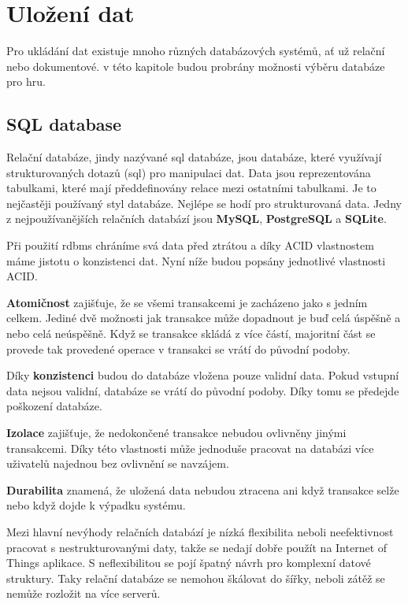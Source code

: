 \section{Uložení dat}\label{sec:data_storage}
Pro ukládání dat existuje mnoho různých databázových systémů, ať už relační nebo dokumentové. v této kapitole budou probrány možnosti výběru databáze pro hru.

\subsection{SQL database}\label{sec:data_storage:relational_db}
Relační databáze, jindy nazývané \gls{sql} databáze, jsou databáze, které využívají strukturovaných dotazů (\gls{sql}) pro manipulaci dat. Data jsou reprezentována tabulkami, které mají předdefinovány relace mezi ostatními tabulkami. Je to nejčastěji používaný styl databáze. Nejlépe se hodí pro strukturovaná data. Jedny z nejpoužívanějších relačních databází jsou \textbf{MySQL}, \textbf{PostgreSQL} a \textbf{SQLite}.\cite{guidetochoosingdatabase}\cite{howtochoosedatabase}

Při použití \gls{rdbms} chráníme svá data před ztrátou a díky ACID vlastnostem máme jistotu o konzistenci dat. Nyní níže budou popsány jednotlivé vlastnosti ACID.\label{sec:data_storage:relational_db:ACID}\cite{acidvsbase}

\textbf{Atomičnost} zajišťuje, že se všemi transakcemi je zacházeno jako s jedním celkem. Jediné dvě možnosti jak transakce může dopadnout je buď celá úspěšně a nebo celá neúspěšně. Když se transakce skládá z více částí, majoritní část se provede tak provedené operace v transakci se vrátí do původní podoby.

Díky \textbf{konzistenci} budou do databáze vložena pouze validní data. Pokud vstupní data nejsou validní, databáze se vrátí do původní podoby. Díky tomu se předejde poškození databáze.

\textbf{Izolace}  zajišťuje, že nedokončené transakce nebudou ovlivněny jinými transakcemi. Díky této vlastnosti může jednoduše pracovat na databázi více uživatelů najednou bez ovlivnění se navzájem.

\textbf{Durabilita} znamená, že uložená data nebudou ztracena ani když transakce selže nebo když dojde k výpadku systému.

Mezi hlavní nevýhody relačních databází je nízká flexibilita neboli neefektivnost pracovat s nestrukturovanými daty, takže se nedají dobře použít na Internet of Things aplikace. S neflexibilitou se pojí špatný návrh pro komplexní datové struktury. Taky relační databáze se nemohou škálovat do šířky, neboli zátěž se nemůže rozložit na více serverů.

